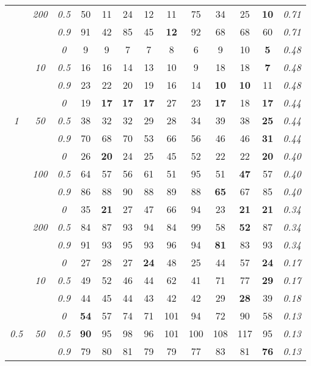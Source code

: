 \begin{table}
\begin{center}
\begin{tabular}{ccc|cc|cc|cc|cc|c|c}
 & \it  200  & \it  0.5  & 50 & 11 & 24 & 12 & 11 & 75 & 34 & 25 & {\bf 10} & \it  0.71 \\
& & \it  0.9  & 91 & 42 & 85 & 45 & {\bf 12} & 92 & 68 & 68 & 60 & \it  0.71 \\
\hline\rule{0pt}{3ex}
& & \it  0  & 9 & 9 & 7 & 7 & 8 & 6 & 9 & 10 & {\bf 5} & \it  0.48 \\
 & \it  10  & \it  0.5  & 16 & 16 & 14 & 13 & 10 & 9 & 18 & 18 & {\bf 7} & \it  0.48 \\
& & \it  0.9  & 23 & 22 & 20 & 19 & 16 & 14 & {\bf 10} & {\bf 10} & 11 & \it  0.48 \\[1ex]
\cline{2-3}\rule{0pt}{3ex}
& & \it  0  & 19 & {\bf 17} & {\bf 17} & {\bf 17} & 27 & 23 & {\bf 17} & 18 & {\bf 17} & \it  0.44 \\
\it  1  & \it  50  & \it  0.5  & 38 & 32 & 32 & 29 & 28 & 34 & 39 & 38 & {\bf 25} & \it  0.44 \\
& & \it  0.9  & 70 & 68 & 70 & 53 & 66 & 56 & 46 & 46 & {\bf 31} & \it  0.44 \\[1ex]
\cline{2-3}\rule{0pt}{3ex}
& & \it  0  & 26 & {\bf 20} & 24 & 25 & 45 & 52 & 22 & 22 & {\bf 20} & \it  0.40 \\
 & \it  100  & \it  0.5  & 64 & 57 & 56 & 61 & 51 & 95 & 51 & {\bf 47} & 57 & \it  0.40 \\
& & \it  0.9  & 86 & 88 & 90 & 88 & 89 & 88 & {\bf 65} & 67 & 85 & \it  0.40 \\[1ex]
\cline{2-3}\rule{0pt}{3ex}
& & \it  0  & 35 & {\bf 21} & 27 & 47 & 66 & 94 & 23 & {\bf 21} & {\bf 21} & \it  0.34 \\
 & \it  200  & \it  0.5  & 84 & 87 & 93 & 94 & 84 & 99 & 58 & {\bf 52} & 87 & \it  0.34 \\
& & \it  0.9  & 91 & 93 & 95 & 93 & 96 & 94 & {\bf 81} & 83 & 93 & \it  0.34 \\
\hline\rule{0pt}{3ex}
& & \it  0  & 27 & 28 & 27 & {\bf 24} & 48 & 25 & 44 & 57 & {\bf 24} & \it  0.17 \\
 & \it  10  & \it  0.5  & 49 & 52 & 46 & 44 & 62 & 41 & 71 & 77 & {\bf 29} & \it  0.17 \\
& & \it  0.9  & 44 & 45 & 44 & 43 & 42 & 42 & 29 & {\bf 28} & 39 & \it  0.18 \\[1ex]
\cline{2-3}\rule{0pt}{3ex}
& & \it  0  & {\bf 54} & 57 & 74 & 71 & 101 & 94 & 72 & 90 & 58 & \it  0.13 \\
\it  0.5  & \it  50  & \it  0.5  & {\bf 90} & 95 & 98 & 96 & 101 & 100 & 108 & 117 & 95 & \it  0.13 \\
& & \it  0.9  & 79 & 80 & 81 & 79 & 79 & 77 & 83 & 81 & {\bf 76} & \it  0.13 \\[1ex]

\end{tabular}
\end{center}
\end{table}
